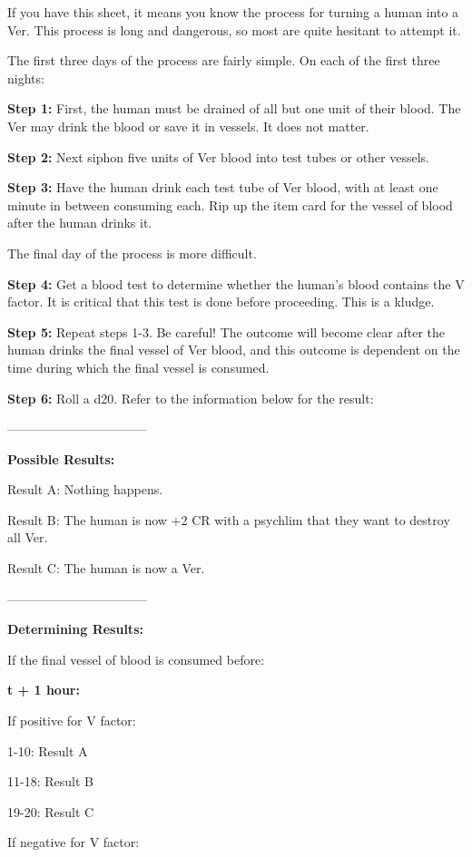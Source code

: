 \documentclass[green]{guildcamp4}
\begin{document}
\name{\gTurning{}}

If you have this sheet, it means you know the process for turning a human into a Ver. This process is long and dangerous, so most are quite hesitant to attempt it.

The first three days of the process are fairly simple. On each of the first three nights:

{\bf Step 1:} First, the human must be drained of all but one unit of their blood. The Ver may drink the blood or save it in vessels. It does not matter. 

{\bf Step 2:} Next siphon five units of Ver blood into test tubes or other vessels.

{\bf Step 3:} Have the human drink each test tube of Ver blood, with at least one minute in between consuming each. Rip up the item card for the vessel of blood after the human drinks it.

The final day of the process is more difficult.

{\bf Step 4:} Get a blood test to determine whether the human's blood contains the V factor. It is critical that this test is done before proceeding. This is a kludge.

{\bf Step 5:} Repeat steps 1-3. Be careful! The outcome will become clear after the human drinks the final vessel of Ver blood, and this outcome is dependent on the time during which the final vessel is consumed.

{\bf Step 6:} Roll a d20. Refer to the information below for the result:

---------------------------------

{\bf Possible Results:}

Result A: Nothing happens.

Result B: The human is now +2 CR with a psychlim that they want to destroy all Ver.

Result C: The human is now a Ver.

---------------------------------

{\bf Determining Results:}

If the final vessel of blood is consumed before:

{\bf t + 1 hour:}

If positive for V factor:

1-10: Result A

11-18: Result B

19-20: Result C

If negative for V factor:
\end{document}
